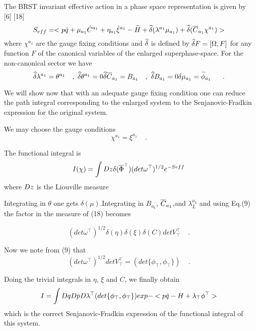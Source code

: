 \documentclass[a4paper,10pt]{article}
\begin{document}
The BRST invariant effective action in a phase space representation is given
by [6] [18]
\begin{equation}
\label{15}
S_{eff}=<p\dot{q}+\mu_{a_1}\dot{C}^{a_1}+\eta_{a_1}\dot{\xi}^{a_1}-
\widehat{H}+\widehat{\delta}(\lambda^{a_1}\mu_{a_1})+\widehat{\delta}(\overline{C}_{a_1}\chi^{a_1})>
\end{equation}
where $\chi^{a_1}$ are the gauge fixing conditions and $\widehat{\delta}$ is
defined by $\widehat{\delta}F=[\Omega ,F]$
for any function $F$ of the canonical variables of
the enlarged superphase-space. For the non-canonical sector we have
\begin{equation}
\label{16}
\widehat{\delta}\lambda^{a_1} =\theta^{a_1}\ \ \ ,\ \widehat{\delta}\theta^{a_1}=0
\\  \widehat{\delta}\overline{C}_{a_1} =B_{a_1}\ \ \ ,\ \widehat{\delta}B_{a_1}=0 \\
\delta\mu_{a_1}=\widetilde{\phi}_{a_1}\ \ \ \ \ .
\end{equation}

We will show  now that with an adequate gauge fixing condition one can reduce
the path  integral corresponding to the enlarged system to the
Senjanovic-Fradkin  expression for the original system.

We may  choose the gauge conditions
\begin{equation}
\label{17}
\chi^{a_1}=\xi^{a_1}\ \ \ \ \ .
\end{equation}


The functional integral is
\begin{equation}
\label{18}
I(\chi )=\int {D} z\delta (\overline{\Phi}^\top )(det \omega^\top
)^{1/2}e^{-Seff}
\end{equation}
where ${D} z$ is the Liouville measure

Integrating in $\theta$ one gets $\delta (\mu )$.Integrating in $B_{a_1}$,
$\overline{C}_{a_1}$,and $\lambda^{a_2}_L$ and using Eq.(9) the factor in the
measure of (18) becomes

\begin{equation}
\label{20}
(det \omega^\top )^{1/2}\delta (\eta )\delta (\xi )\delta (C)det V_{\top}^\top
\ \ \ \ \ .
\end{equation}


Now we note from (9) that
\begin{equation}
\label{21}
(det \omega^\top )^{1/2}det V_{\top}^\top =(det \{\phi_\top ,\phi_\top \} )
\ \ \ \ \ .
\end{equation}

Doing the trivial integrals in $\eta$, $\xi$ and $C$, we  finally obtain
\begin{equation}
\label{22}
I=\int {D} q {D} p {D} \lambda^\top (det \{\phi_\top ,\phi_\top \})exp-
<p\dot{q}-H+\lambda_\top \phi^\top >
\end{equation}
which is the correct Senjanovic-Fradkin expression of the functional integral
of this system.
\end{document}
